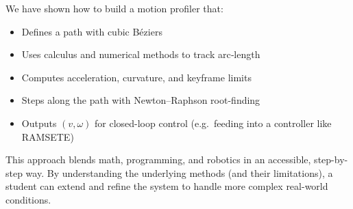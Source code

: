 \documentclass[11pt]{article}
\begin{document}
We have shown how to build a motion profiler that:
\begin{itemize}
  \item Defines a path with cubic Béziers
  \item Uses calculus and numerical methods to track arc‐length
  \item Computes acceleration, curvature, and keyframe limits
  \item Steps along the path with Newton–Raphson root-finding
  \item Outputs \((v,\omega)\) for closed-loop control (e.g.\ feeding into a controller like RAMSETE)
\end{itemize}

This approach blends math, programming, and robotics in an accessible, step-by-step way. By understanding the underlying methods (and their limitations), a student can extend and refine the system to handle more complex real-world conditions.
\end{document}
